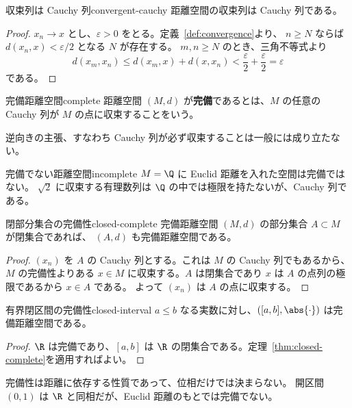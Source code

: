 \begin{claim}{収束列は Cauchy 列}{convergent-cauchy}
距離空間の収束列は Cauchy 列である。
\end{claim}

\begin{proof}
$x_n \to x$ とし、$\varepsilon > 0$ をとる。定義~\ref{def:convergence}より、
$n \geq N$ ならば $d(x_n, x) < \varepsilon / 2$ となる $N$ が存在する。
$m, n \geq N$ のとき、三角不等式より
\[
  d(x_m, x_n) \leq d(x_m, x) + d(x, x_n) < \frac{\varepsilon}{2} + \frac{\varepsilon}{2} = \varepsilon
\]
である。
\end{proof}

\begin{definition}{完備距離空間}{complete}
距離空間 $(M, d)$ が\textbf{完備}であるとは、$M$ の任意の Cauchy 列が $M$ の点に収束することをいう。
\end{definition}

逆向きの主張、すなわち Cauchy 列が必ず収束することは一般には成り立たない。

\begin{example}{完備でない距離空間}{incomplete}
$M = \Q$ に Euclid 距離を入れた空間は完備ではない。
$\sqrt{2}$ に収束する有理数列は $\Q$ の中では極限を持たないが、Cauchy 列である。
\end{example}

\begin{theorem}{閉部分集合の完備性}{closed-complete}
完備距離空間 $(M, d)$ の部分集合 $A \subset M$ が閉集合であれば、
$(A, d)$ も完備距離空間である。
\end{theorem}

\begin{proof}
$(x_n)$ を $A$ の Cauchy 列とする。これは $M$ の Cauchy 列でもあるから、
$M$ の完備性よりある $x \in M$ に収束する。$A$ は閉集合であり
$x$ は $A$ の点列の極限であるから $x \in A$ である。
よって $(x_n)$ は $A$ の点に収束する。
\end{proof}

\begin{corollary}{有界閉区間の完備性}{closed-interval}
$a \leq b$ なる実数に対し、$([a, b], \abs{\cdot})$ は完備距離空間である。
\end{corollary}

\begin{proof}
$\R$ は完備であり、$[a, b]$ は $\R$ の閉集合である。定理~\ref{thm:closed-complete}を適用すればよい。
\end{proof}

\begin{memo*}
完備性は距離に依存する性質であって、位相だけでは決まらない。
開区間 $(0, 1)$ は $\R$ と同相だが、Euclid 距離のもとでは完備でない。
\end{memo*}

